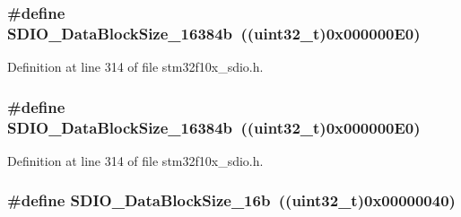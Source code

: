 \subsubsection[{\texorpdfstring{S\+D\+I\+O\+\_\+\+Data\+Block\+Size\+\_\+16384b}{SDIO_DataBlockSize_16384b}}]{\setlength{\rightskip}{0pt plus 5cm}\#define S\+D\+I\+O\+\_\+\+Data\+Block\+Size\+\_\+16384b~(({\bf uint32\+\_\+t})0x000000\+E0)}\hypertarget{group___s_d_i_o___data___block___size_gae80bc49dbed677f7087d523c31fe10ae}{}\label{group___s_d_i_o___data___block___size_gae80bc49dbed677f7087d523c31fe10ae}


Definition at line 314 of file stm32f10x\+\_\+sdio.\+h.

\subsubsection[{\texorpdfstring{S\+D\+I\+O\+\_\+\+Data\+Block\+Size\+\_\+16384b}{SDIO_DataBlockSize_16384b}}]{\setlength{\rightskip}{0pt plus 5cm}\#define S\+D\+I\+O\+\_\+\+Data\+Block\+Size\+\_\+16384b~(({\bf uint32\+\_\+t})0x000000\+E0)}\hypertarget{group___s_d_i_o___data___block___size_gae80bc49dbed677f7087d523c31fe10ae}{}\label{group___s_d_i_o___data___block___size_gae80bc49dbed677f7087d523c31fe10ae}


Definition at line 314 of file stm32f10x\+\_\+sdio.\+h.

\subsubsection[{\texorpdfstring{S\+D\+I\+O\+\_\+\+Data\+Block\+Size\+\_\+16b}{SDIO_DataBlockSize_16b}}]{\setlength{\rightskip}{0pt plus 5cm}\#define S\+D\+I\+O\+\_\+\+Data\+Block\+Size\+\_\+16b~(({\bf uint32\+\_\+t})0x00000040)}\hypertarget{group___s_d_i_o___data___block___size_ga52a7bdab9a75edd94d9c1152e8b078e2}{}\label{group___s_d_i_o___data___block___size_ga52a7bdab9a75edd94d9c1152e8b078e2}


